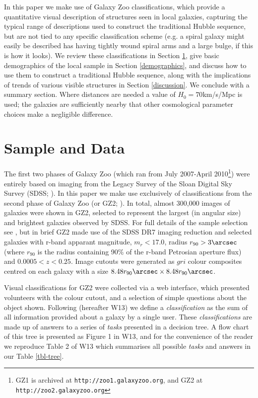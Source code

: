 \documentclass[usenatbib]{mn2e}
\begin{document}
In this paper we make use of Galaxy Zoo classifications, which provide a quantitative visual description of structures seen in local galaxies, capturing the typical range of descriptions used to construct the traditional Hubble sequence, but are not tied to any specific classification scheme (e.g. a spiral galaxy might easily be described has having tightly wound spiral arms and a large bulge, if this is how it looks). We review these classifications in Section \ref{sample}, give basic demographics of the local sample in Section \ref{demographics}, and discuss how to use them to construct a traditional Hubble sequence, along with the implications of trends of various visible structures in Section \ref{discussion}. We conclude with a summary section. Where distances are needed a value of $H_0 = 70$km/s/Mpc is used; the galaxies are sufficiently nearby that other cosmological parameter choices make a negligible difference. 

\section{Sample and Data} \label{sample}

The first two phases of Galaxy Zoo (which ran from July 2007-April 2010\footnote{GZ1 is archived at {\tt http://zoo1.galaxyzoo.org}, and GZ2 at {\tt http://zoo2.galaxyzoo.org}}) were entirely based on imaging from the Legacy Survey of the Sloan Digital Sky Survey (SDSS; \citealt{York2000}). In this paper we make use exclusively of classifications from the second phase of Galaxy Zoo (or GZ2; \citealt{Willett2013}). In total, almost 300,000 images of galaxies were shown in GZ2, selected to represent the largest (in angular size) and brightest galaxies observed by SDSS. For full details of the sample selection see \citet{Willett2013}, but in brief GZ2 made use of the SDSS DR7 imaging reduction \citep{DR7} and selected galaxies with r-band apparant magnitude, $m_r<17.0$, radius $r_{90}>3\arcsec$ (where $r_{90}$ is the radius containing 90\% of the r-band Petrosian aperture flux) and $0.0005<z<0.25$. Image cutouts were generated as $gri$ colour composites centred on each galaxy with a size $8.48r_{90}\arcsec \times 8.48r_{90}\arcsec$. 

Visual classifications for GZ2 were collected via a web interface, which presented volunteers with the colour cutout, and a selection of simple questions about the object shown. Following \citet{Willett2013} (hereafter W13) we define a {\it classification} as the sum of all information provided about a galaxy by a single user. These {\it classifications} are made up of answers to a series of {\it tasks} presented in a decision tree. A flow chart of this tree is presented as Figure 1 in W13, and for the convenience of the reader we reproduce Table 2 of W13 which summarises all possible {\it tasks} and answers in our Table \ref{tbl-tree}. 
\end{document}
